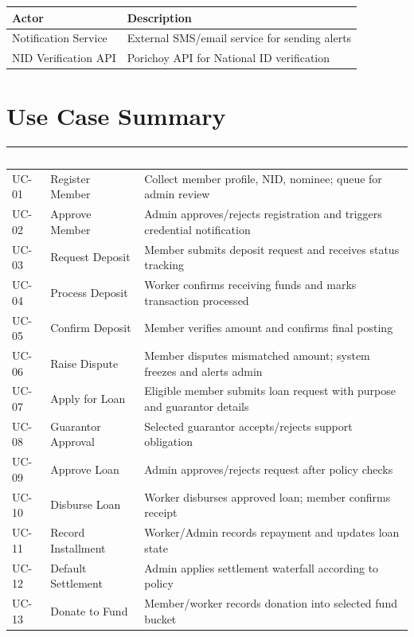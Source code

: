 \documentclass[11pt,a4paper]{article}
\begin{document}
\begin{tabular}{@{}p{3cm}p{10cm}@{}}
\toprule
\textbf{Actor} & \textbf{Description} \\
\midrule
Notification Service & External SMS/email service for sending alerts \\
\addlinespace
NID Verification API & Porichoy API for National ID verification \\
\bottomrule
\end{tabular}

\section{Use Case Summary}

\begin{longtable}{@{}>{\columncolor{tableheader}}p{}p{}p{}@{}}
\toprule
\rowcolor{primaryblue}
\textcolor{white}{\textbf{ID}} & \textcolor{white}{\textbf{Name}} & \textcolor{white}{\textbf{Summary}} \\
\midrule
\endhead
UC-01 & Register Member & Collect member profile, NID, nominee; queue for admin review \\
\midrule
UC-02 & Approve Member & Admin approves/rejects registration and triggers credential notification \\
\midrule
UC-03 & Request Deposit & Member submits deposit request and receives status tracking \\
\midrule
UC-04 & Process Deposit & Worker confirms receiving funds and marks transaction processed \\
\midrule
UC-05 & Confirm Deposit & Member verifies amount and confirms final posting \\
\midrule
UC-06 & Raise Dispute & Member disputes mismatched amount; system freezes and alerts admin \\
\midrule
UC-07 & Apply for Loan & Eligible member submits loan request with purpose and guarantor details \\
\midrule
UC-08 & Guarantor Approval & Selected guarantor accepts/rejects support obligation \\
\midrule
UC-09 & Approve Loan & Admin approves/rejects request after policy checks \\
\midrule
UC-10 & Disburse Loan & Worker disburses approved loan; member confirms receipt \\
\midrule
UC-11 & Record Installment & Worker/Admin records repayment and updates loan state \\
\midrule
UC-12 & Default Settlement & Admin applies settlement waterfall according to policy \\
\midrule
UC-13 & Donate to Fund & Member/worker records donation into selected fund bucket \\
\bottomrule
\end{longtable}
\end{document}
